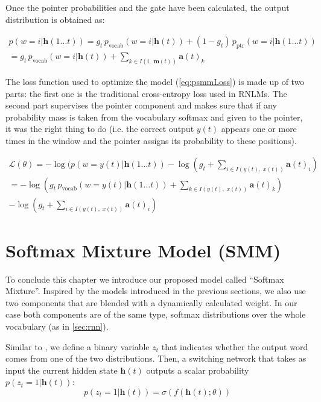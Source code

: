 Once the pointer probabilities and the gate have been calculated, the output distribution is obtained as:

\begin{equation}
	\begin{gathered}
		p(w=i|\mathbf{h}(1\ldots t)) = g_t \, p_{\text{vocab}}(w=i|\mathbf{h}(t)) + (1-g_t) \, p_{\text{ptr}}(w=i|\mathbf{h}(1\ldots t)) \\
		= g_t \, p_{\text{vocab}}(w=i|\mathbf{h}(t)) + \sum_{k \in I(i, \; \mathbf{m}(t))}\mathbf{a}(t)_k
	\end{gathered}
\end{equation}

The loss function used to optimize the model (\autoref{eq:psmmLoss}) is made up of two parts: the first one is the traditional cross-entropy loss used in RNLMs. The second part supervises the pointer component and makes sure that if any probability mass is taken from the vocabulary softmax and given to the pointer, it was the right thing to do (i.e. the correct output $y(t)$ appears one or more times in the window and the pointer assigns its probability to these positions).

\begin{equation} \label{eq:psmmLoss}
	\begin{gathered}
		\mathcal{L}(\theta) = -\log(p(w=y(t)|\mathbf{h}(1\ldots t)) -\log(g_t + \sum_{i \in I(y(t), \; x(t))}\mathbf{a}(t)_i) \\
		= -\log(g_t \, p_{\text{vocab}}(w=y(t)|\mathbf{h}(1\ldots t)) + \sum_{k \in I(y(t), \; x(t))}\mathbf{a}(t)_k) \\
		-\log(g_t + \sum_{i \in I(y(t), \; x(t))}\mathbf{a}(t)_i)
	\end{gathered}
\end{equation}

\section{Softmax Mixture Model (SMM)}
\label{sec:mixtureModel}

To conclude this chapter we introduce our proposed model called ``Softmax Mixture''. Inspired by the models introduced in the previous sections, we also use two components that are blended with a dynamically calculated weight. In our case both components are of the same type, softmax distributions over the whole vocabulary (as in \autoref{sec:rnn}).

Similar to \cite{gulcehre2016pointing}, we define a binary variable $z_t$ that indicates whether the output word comes from one of the two distributions. Then, a switching network that takes as input the current hidden state $\mathbf{h}(t)$ outputs a scalar probability $p(z_t=1|\mathbf{h}(t))$: 
\begin{equation} \label{eq:probSwitch}
	p(z_t=1|\mathbf{h}(t)) = \sigma(f(\mathbf{h}(t);\theta))
\end{equation}

